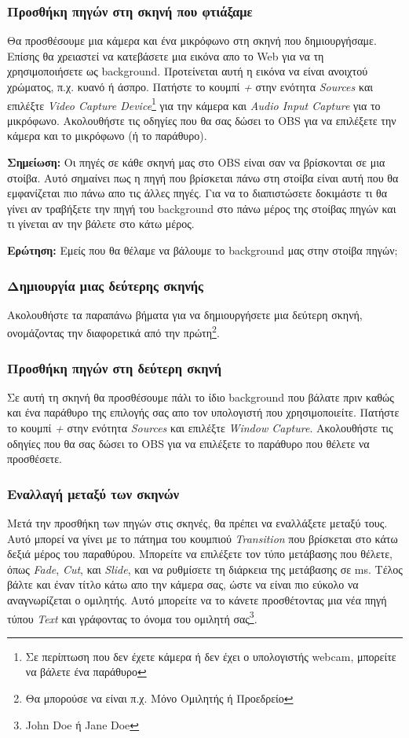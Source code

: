 \documentclass[12pt,a4paper]{article}
\begin{document}
\subsubsection{Προσθήκη πηγών στη σκηνή που φτιάξαμε}
Θα προσθέσουμε μια κάμερα και ένα μικρόφωνο στη σκηνή που δημιουργήσαμε. Επίσης θα χρειαστεί να κατεβάσετε μια
εικόνα απο το Web για να τη χρησιμοποιήσετε ως background. Προτείνεται αυτή η εικόνα να είναι
ανοιχτού χρώματος, π.χ. κυανό ή άσπρο. Πατήστε το κουμπί \textit{+} στην
ενότητα \textit{Sources} και επιλέξτε \textit{Video Capture Device}\footnote{Σε περίπτωση που δεν έχετε κάμερα ή δεν έχει ο υπολογιστής webcam, μπορείτε να βάλετε ένα παράθυρο} για την κάμερα και \textit{Audio Input Capture}
για το μικρόφωνο. Ακολουθήστε τις οδηγίες που θα σας δώσει το OBS για να επιλέξετε την κάμερα και το μικρόφωνο (ή το παράθυρο).
\begin{info}
\textbf{Σημείωση:} Οι πηγές σε κάθε σκηνή μας στο OBS είναι σαν να βρίσκονται σε μια στοίβα. 
Αυτό σημαίνει πως η πηγή που βρίσκεται πάνω στη στοίβα είναι αυτή που θα εμφανίζεται πιο πάνω απο τις άλλες πηγές.
Για να το διαπιστώσετε δοκιμάστε τι θα γίνει αν τραβήξετε την πηγή του background στο πάνω μέρος της στοίβας πηγών
και τι γίνεται αν την βάλετε στο κάτω μέρος.
\end{info}
\begin{questionbox}
\textbf{Ερώτηση:} Εμείς που θα θέλαμε να βάλουμε το background μας στην στοίβα πηγών;
\end{questionbox}
\subsubsection{Δημιουργία μιας δεύτερης σκηνής}
Ακολουθήστε τα παραπάνω βήματα για να δημιουργήσετε μια δεύτερη σκηνή, ονομάζοντας 
την διαφορετικά από την πρώτη\footnote{Θα μπορούσε να είναι π.χ. Μόνο Ομιλητής ή Προεδρείο}.
\subsubsection{Προσθήκη πηγών στη δεύτερη σκηνή}
Σε αυτή τη σκηνή θα προσθέσουμε πάλι το ίδιο background που βάλατε πριν καθώς και ένα παράθυρο της επιλογής σας
απο τον υπολογιστή που χρησιμοποιείτε. Πατήστε το κουμπί \textit{+} στην ενότητα \textit{Sources} και επιλέξτε \textit{Window Capture}.
Ακολουθήστε τις οδηγίες που θα σας δώσει το OBS για να επιλέξετε το παράθυρο που θέλετε να προσθέσετε.
\subsubsection{Εναλλαγή μεταξύ των σκηνών}
Μετά την προσθήκη των πηγών στις σκηνές, θα πρέπει να εναλλάξετε μεταξύ τους. Αυτό μπορεί να γίνει με το πάτημα
του κουμπιού \textit{Transition} που βρίσκεται στο κάτω δεξιά μέρος του παραθύρου. Μπορείτε να επιλέξετε τον τύπο
μετάβασης που θέλετε, όπως \textit{Fade}, \textit{Cut}, και \textit{Slide}, και να ρυθμίσετε τη διάρκεια της μετάβασης σε ms.
Τέλος βάλτε και έναν τίτλο κάτω απο την κάμερα σας, ώστε να είναι πιο εύκολο να αναγνωρίζεται ο ομιλητής. Αυτό μπορείτε να το κάνετε
προσθέτοντας μια νέα πηγή τύπου \textit{Text} και γράφοντας το όνομα του ομιλητή σας\footnote{John Doe ή Jane Doe}.
\end{document}
